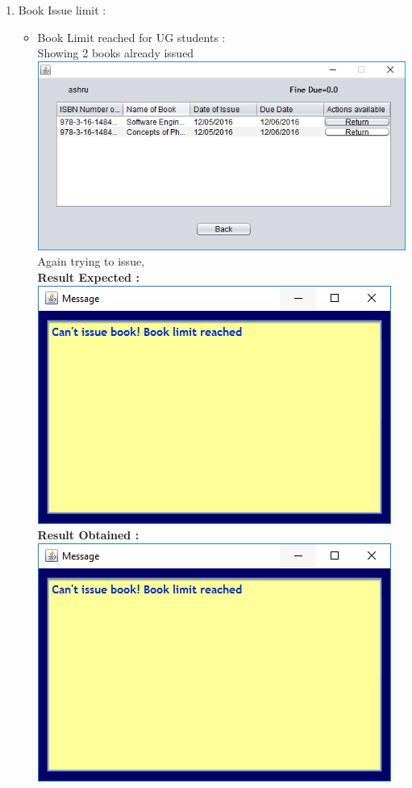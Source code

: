 \documentclass{article}
\begin{document}
\begin{enumerate}
\item Book Issue limit :\\
\begin{itemize}
	

	
\item Book Limit reached for UG students :\\
Showing 2 books already issued\\
\includegraphics[scale=0.8]{images/BookLimitUG.PNG}\\
Again trying to issue,\\
\textbf{Result Expected :}\\
\includegraphics[scale=0.8]{images/BookLimitError.PNG}\\
\textbf{Result Obtained :}\\
\includegraphics[scale=0.8]{images/BookLimitError.PNG}\\

\end{itemize}
\end{enumerate}
\end{document}
